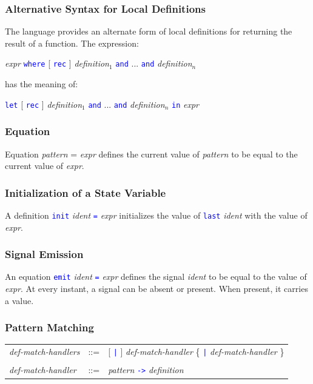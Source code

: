 \documentclass[11pt,titlepage,twoside]{report}
\newcommand{\Let}{\mbox{{\tt let}}}
\newcommand{\Rec}{\mbox{{\tt rec}}}
\newcommand{\In}{\mbox{{\tt in}}}
\newcommand{\And}{\mbox{{\tt and}}}
\newcommand{\Emit}{\mbox{{\tt emit}}}
\newcommand{\Last}{\mbox{{\tt last}}}
\newcommand{\Minusgreater}{\mbox{{\tt ->}}}
\newcommand{\Where}{\mbox{{\tt where}}}
\newcommand{\term}[1]{\textcolor{Blue}{\tt #1}}
\newcommand{\nterm}[1]{\textcolor{BrickRed}{\it #1}}
\newcommand{\term}[1]{{\tt #1}}
\newcommand{\nterm}[1]{{\em #1}}
\begin{document}
\subsubsection{Alternative Syntax for Local Definitions}

The language provides an alternate form of local definitions for returning
the result of a function. The expression:
\begin{center}
\nterm{expr} \term{\Where} [ \term{\Rec} ]
  \nterm{definition}$_1$ \term{\And} ... \term{\And} \nterm{definition}$_n$ 
\end{center}
has the meaning of:
\begin{center}
  \term{\Let} [ \term{\Rec} ] 
  \nterm{definition}$_1$ \term{\And} ... \term{\And} \nterm{definition}$_n$
  \term{\In} \nterm{expr}
\end{center}

\subsubsection{Equation}

Equation \nterm{pattern} = \nterm{expr} defines the current
value of \nterm{pattern} to be equal to the current value of \nterm{expr}.

\subsubsection{Initialization of a State Variable}

A definition \term{init} \nterm{ident} \term{=} \nterm{expr} initializes
the value of \term{\Last} \nterm{ident} with the
value of \nterm{expr}.

\subsubsection{Signal Emission}

An equation \term{\Emit} \nterm{ident} \term{=} \nterm{expr} defines
the signal \nterm{ident} to be equal to the value of \nterm{expr}. At
every instant, a signal can be absent or present. When present, it carries
a value.

\subsubsection{Pattern Matching}

\begin{center}
\begin{tabular}{lcl}
\nterm{def-match-handlers}
   & ::=        & [ \term{|} ] \nterm{def-match-handler}
                  \{ \term{|} \nterm{def-match-handler} \} 
\\ \\
\nterm{def-match-handler}
   & ::=        & \nterm{pattern} \term{\Minusgreater} \nterm{definition}
\end{tabular}
\end{center}
\end{document}
